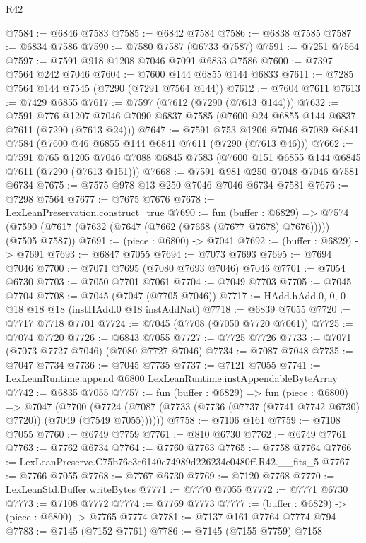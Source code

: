 \begin{lexlean}{R42}
\begin{coremodule}
{@7584 := @6846 @7583
@7585 := @6842 @7584
@7586 := @6838 @7585
@7587 := @6834 @7586
@7590 := @7580 @7587 (@6733 @7587)
@7591 := @7251 @7564
@7597 := @7591 @918 @1208 @7046 @7091 @6833 @7586
@7600 := @7397 @7564 @242 @7046
@7604 := @7600 @144 @6855 @144 @6833
@7611 := @7285 @7564 @144 @7545 (@7290 (@7291 @7564 @144))
@7612 := @7604 @7611
@7613 := @7429 @6855
@7617 := @7597 (@7612 (@7290 (@7613 @144)))
@7632 := @7591
    @776
    @1207
    @7046
    @7090
    @6837
    @7585
    (@7600 @24 @6855 @144 @6837 @7611 (@7290 (@7613 @24)))
@7647 := @7591
    @753
    @1206
    @7046
    @7089
    @6841
    @7584
    (@7600 @46 @6855 @144 @6841 @7611 (@7290 (@7613 @46)))
@7662 := @7591
    @765
    @1205
    @7046
    @7088
    @6845
    @7583
    (@7600 @151 @6855 @144 @6845 @7611 (@7290 (@7613 @151)))
@7668 := @7591 @981 @250 @7048 @7046 @7581 @6734
@7675 := @7575 @978 @13 @250 @7046 @7046 @6734 @7581
@7676 := @7298 @7564
@7677 := @7675 @7676
@7678 := LexLeanPreservation.construct_true
@7690 := fun (buffer : @6829) =>
  @7574 (@7590 (@7617 (@7632 (@7647 (@7662 (@7668 (@7677 @7678) @7676))))) (@7505 @7587))
@7691 := (piece : @6800) -> @7041
@7692 := (buffer : @6829) -> @7691
@7693 := @6847 @7055
@7694 := @7073 @7693
@7695 := @7694 @7046
@7700 := @7071 @7695 (@7080 @7693 @7046) @7046
@7701 := @7054 @6730
@7703 := @7050 @7701 @7061
@7704 := @7049 @7703
@7705 := @7045 @7704
@7708 := @7045 (@7047 (@7705 @7046))
@7717 := HAdd.hAdd.{0, 0, 0} @18 @18 @18 (instHAdd.{0} @18 instAddNat)
@7718 := @6839 @7055
@7720 := @7717 @7718 @7701
@7724 := @7045 (@7708 (@7050 @7720 @7061))
@7725 := @7074 @7720
@7726 := @6843 @7055
@7727 := @7725 @7726
@7733 := @7071 (@7073 @7727 @7046) (@7080 @7727 @7046)
@7734 := @7087 @7048
@7735 := @7047 @7734
@7736 := @7045 @7735
@7737 := @7121 @7055
@7741 := LexLeanRuntime.append @6800 LexLeanRuntime.instAppendableByteArray
@7742 := @6835 @7055
@7757 := fun (buffer : @6829) =>
  fun (piece : @6800) =>
  @7047
    (@7700 (@7724 (@7087 (@7733 (@7736 (@7737 (@7741 @7742 @6730) @7720)) (@7049 (@7549 @7055))))))
@7758 := @7106 @161
@7759 := @7108 @7055
@7760 := @6749 @7759
@7761 := @810 @6730
@7762 := @6749 @7761
@7763 := @7762 @6734
@7764 := @7760 @7763
@7765 := @7758 @7764
@7766 := LexLeanPreserve.C75b76e3c6140e74989d226234e0480ff.R42.__fits_5
@7767 := @7766 @7055
@7768 := @7767 @6730
@7769 := @7120 @7768
@7770 := LexLeanStd.Buffer.writeBytes
@7771 := @7770 @7055
@7772 := @7771 @6730
@7773 := @7108 @7772
@7774 := @7769 @7773
@7777 := (buffer : @6829) -> (piece : @6800) -> @7765 @7774
@7781 := @7137 @161 @7764 @7774 @794
@7783 := @7145 (@7152 @7761)
@7786 := @7145 (@7155 @7759) @7158
}
\end{coremodule}
\end{lexlean}
